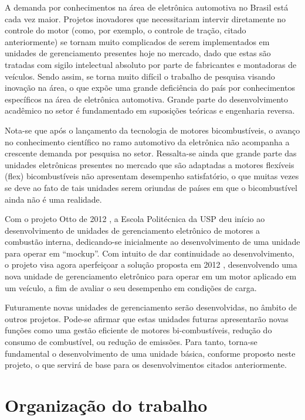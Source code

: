 	A demanda por conhecimentos na área de eletrônica automotiva no Brasil está cada vez maior. Projetos inovadores que necessitariam intervir diretamente no controle do motor (como, por exemplo, o controle de tração, citado anteriormente) se tornam muito complicados de serem implementados em unidades de gerenciamento presentes hoje no mercado, dado que estas são tratadas com sigilo intelectual absoluto por parte de fabricantes e montadoras de veículos. Sendo assim, se torna muito difícil o trabalho de pesquisa visando inovação na área, o que expõe uma grande deficiência do país por conhecimentos específicos na área de eletrônica automotiva. Grande parte do desenvolvimento acadêmico no setor é fundamentado em suposições teóricas e engenharia reversa.

	Nota-se que após o lançamento da tecnologia de motores bicombustíveis, o avanço no conhecimento científico no ramo automotivo da eletrônica não acompanha a crescente demanda por pesquisa no setor. Ressalta-se ainda que grande parte das unidades eletrônicas presentes no mercado que são adaptadas a motores flexíveis (flex) bicombustíveis não apresentam desempenho satisfatório, o que muitas vezes se deve ao fato de tais unidades serem oriundas de países em que o bicombustível ainda não é uma realidade.

	Com o projeto Otto de 2012 \cite{andre2012}, a Escola Politécnica da USP deu início ao desenvolvimento de unidades de gerenciamento eletrônico de motores a combustão interna, dedicando-se inicialmente ao desenvolvimento de uma unidade para operar em "`mockup"'. Com intuito de dar continuidade ao desenvolvimento, o projeto visa agora aperfeiçoar a solução proposta em 2012 \cite{andre2012}, desenvolvendo uma nova unidade de gerenciamento eletrônico para operar em um motor aplicado em um veículo, a fim de avaliar o seu desempenho em condições de carga.
	
	Futuramente novas unidades de gerenciamento serão desenvolvidas, no âmbito de outros projetos. Pode-se afirmar que estas unidades futuras apresentarão novas funções como uma gestão eficiente de motores bi-combustíveis, redução do consumo de combustível, ou redução de emissões. Para tanto, torna-se fundamental o desenvolvimento de uma unidade básica, conforme proposto neste projeto, o que servirá de base para os desenvolvimentos citados anteriormente.

\section{Organização do trabalho}

